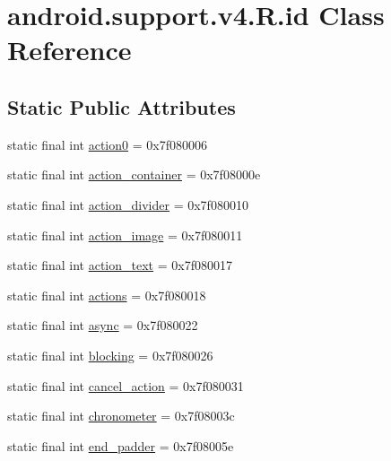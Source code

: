 \hypertarget{classandroid_1_1support_1_1v4_1_1R_1_1id}{}\section{android.\+support.\+v4.\+R.\+id Class Reference}
\label{classandroid_1_1support_1_1v4_1_1R_1_1id}
\subsection*{Static Public Attributes}
\begin{DoxyCompactItemize}
\item 
static final int \mbox{\hyperlink{classandroid_1_1support_1_1v4_1_1R_1_1id_ad7592f41400f9252a235131ada4828fb}{action0}} = 0x7f080006
\item 
static final int \mbox{\hyperlink{classandroid_1_1support_1_1v4_1_1R_1_1id_a1617e4a9372cb50c61bb626f78a0a55d}{action\+\_\+container}} = 0x7f08000e
\item 
static final int \mbox{\hyperlink{classandroid_1_1support_1_1v4_1_1R_1_1id_a4041bc4105d0b0cf5cc0f800ccb65ab3}{action\+\_\+divider}} = 0x7f080010
\item 
static final int \mbox{\hyperlink{classandroid_1_1support_1_1v4_1_1R_1_1id_a6b9142767e8558d1af9795db9ffd33c1}{action\+\_\+image}} = 0x7f080011
\item 
static final int \mbox{\hyperlink{classandroid_1_1support_1_1v4_1_1R_1_1id_ab16eb01fb830a44ed3fa8f597f28b41b}{action\+\_\+text}} = 0x7f080017
\item 
static final int \mbox{\hyperlink{classandroid_1_1support_1_1v4_1_1R_1_1id_ab48152021fc3f70bd7f40d59bd201328}{actions}} = 0x7f080018
\item 
static final int \mbox{\hyperlink{classandroid_1_1support_1_1v4_1_1R_1_1id_affba5f51dd3beb3137a18fe8b868f042}{async}} = 0x7f080022
\item 
static final int \mbox{\hyperlink{classandroid_1_1support_1_1v4_1_1R_1_1id_ae7200c743d91bf8b61111e5ea58e4476}{blocking}} = 0x7f080026
\item 
static final int \mbox{\hyperlink{classandroid_1_1support_1_1v4_1_1R_1_1id_a1791e09cc075d5474cf241c9df1a6ffd}{cancel\+\_\+action}} = 0x7f080031
\item 
static final int \mbox{\hyperlink{classandroid_1_1support_1_1v4_1_1R_1_1id_a9ba1c8e430ff76f2ee59bfccd415c103}{chronometer}} = 0x7f08003c
\item 
static final int \mbox{\hyperlink{classandroid_1_1support_1_1v4_1_1R_1_1id_a8e2de59a9001feb70cbf25a63296a6c4}{end\+\_\+padder}} = 0x7f08005e

\end{DoxyCompactItemize}
